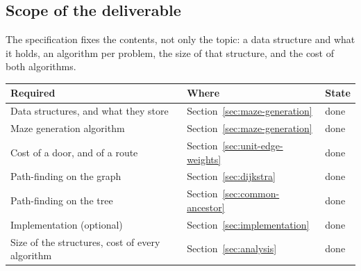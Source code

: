 \subsection{Scope of the deliverable}

The specification fixes the contents, not only the topic: a data structure and
what it holds, an algorithm per problem, the size of that structure, and the
cost of both algorithms.

\begin{center}
\begin{tabular}{@{}lll@{}}
  \toprule
  Required & Where & State \\
  \midrule
  Data structures, and what they store & Section~\ref{sec:maze-generation} & done \\
  Maze generation algorithm          & Section~\ref{sec:maze-generation} & done \\
  Cost of a door, and of a route     & Section~\ref{sec:unit-edge-weights} & done \\
  Path-finding on the graph          & Section~\ref{sec:dijkstra} & done \\
  Path-finding on the tree           & Section~\ref{sec:common-ancestor} & done \\
  Implementation (optional)          & Section~\ref{sec:implementation} & done \\
  Size of the structures, cost of every algorithm & Section~\ref{sec:analysis} & done \\
  \bottomrule
\end{tabular}
\end{center}
